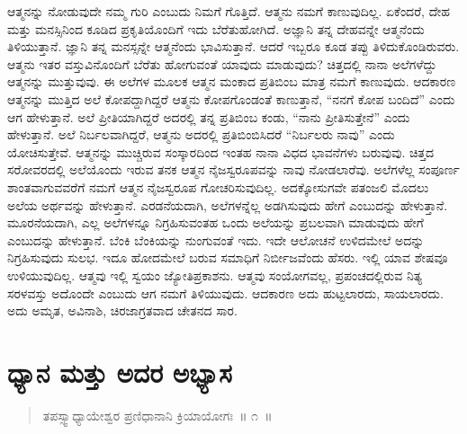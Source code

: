 ಆತ್ಮನನ್ನು ನೋಡುವುದೇ ನಮ್ಮ ಗುರಿ ಎಂಬುದು ನಿಮಗೆ ಗೊತ್ತಿದೆ. ಆತ್ಮನು ನಮಗೆ ಕಾಣುವುದಿಲ್ಲ. ಏಕೆಂದರೆ, ದೇಹ ಮತ್ತು ಮನಸ್ಸಿನಿಂದ ಕೂಡಿದ ಪ್ರಕೃತಿಯೊಂದಿಗೆ ಇದು ಬೆರೆತುಹೋಗಿದೆ. ಅಜ್ಞಾನಿ ತನ್ನ ದೇಹವನ್ನೇ ಆತ್ಮನೆಂದು ತಿಳಿಯುತ್ತಾನೆ. ಜ್ಞಾನಿ ತನ್ನ ಮನಸ್ಸನ್ನೇ ಆತ್ಮನೆಂದು ಭಾವಿಸುತ್ತಾನೆ. ಆದರೆ ಇಬ್ಬರೂ ಕೂಡ ತಪ್ಪು ತಿಳಿದುಕೊಂಡಿರುವರು. ಆತ್ಮನು ಇತರ ವಸ್ತುವಿನೊಂದಿಗೆ ಬೆರೆತು ಹೋಗುವಂತೆ ಯಾವುದು ಮಾಡುವುದು? ಚಿತ್ತದಲ್ಲಿ ನಾನಾ ಅಲೆಗಳೆದ್ದು ಆತ್ಮನನ್ನು ಮುತ್ತುವುವು. ಈ ಅಲೆಗಳ ಮೂಲಕ ಆತ್ಮನ ಮಂಕಾದ ಪ್ರತಿಬಿಂಬ ಮಾತ್ರ ನಮಗೆ ಕಾಣುವುದು. ಆದಕಾರಣ ಆತ್ಮನನ್ನು ಮುತ್ತಿದ ಅಲೆ ಕೋಪದ್ದಾಗಿದ್ದರೆ ಆತ್ಮನು ಕೋಪಗೊಂಡಂತೆ ಕಾಣುತ್ತಾನೆ, “ನನಗೆ ಕೋಪ ಬಂದಿದೆ” ಎಂದು ಆಗ ಹೇಳುತ್ತಾನೆ. ಅಲೆ ಪ್ರೀತಿಯಾಗಿದ್ದರೆ ಅದರಲ್ಲಿ ತನ್ನ ಪ್ರತಿಬಿಂಬ ಕಂಡು, “ನಾನು ಪ್ರೀತಿಸುತ್ತೇನೆ” ಎಂದು ಹೇಳುತ್ತಾನೆ. ಅಲೆ ನಿರ್ಬಲವಾಗಿದ್ದರೆ, ಆತ್ಮನು ಅದರಲ್ಲಿ ಪ್ರತಿಬಿಂಬಿಸಿದರೆ “ನಿರ್ಬಲರು ನಾವು” ಎಂದು ಯೋಚಿಸುತ್ತೇವೆ. ಆತ್ಮನನ್ನು ಮುಚ್ಚಿರುವ ಸಂಸ್ಕಾರದಿಂದ ಇಂತಹ ನಾನಾ ವಿಧದ ಭಾವನೆಗಳು ಬರುವುವು. ಚಿತ್ತದ ಸರೋವರದಲ್ಲಿ ಅಲೆಯೊಂದು ಇರುವ ತನಕ ಆತ್ಮನ ನೈಜಸ್ವರೂಪವನ್ನು ನಾವು ನೋಡಲಾರೆವು. ಅಲೆಗಳೆಲ್ಲ ಸಂಪೂರ್ಣ ಶಾಂತವಾಗುವವರೆಗೆ ನಮಗೆ ಆತ್ಮನ ನೈಜಸ್ವರೂಪ ಗೋಚರಿಸುವುದಿಲ್ಲ. ಅದಕ್ಕೋಸುಗವೇ ಪತಂಜಲಿ ಮೊದಲು ಅಲೆಯ ಅರ್ಥವನ್ನು ಹೇಳುತ್ತಾನೆ. ಎರಡನೆಯದಾಗಿ, ಅಲೆಗಳನ್ನೆಲ್ಲ ಅಡಗಿಸುವುದು ಹೇಗೆ ಎಂಬುದನ್ನು ಹೇಳುತ್ತಾನೆ. ಮೂರನೆಯದಾಗಿ, ಎಲ್ಲ ಅಲೆಗಳನ್ನೂ ನಿಗ್ರಹಿಸುವಂತಹ ಒಂದು ಅಲೆಯನ್ನು ಪ್ರಬಲವಾಗಿ ಮಾಡುವುದು ಹೇಗೆ ಎಂಬುದನ್ನು ಹೇಳುತ್ತಾನೆ. ಬೆಂಕಿ ಬೆಂಕಿಯನ್ನು ನುಂಗುವಂತೆ ಇದು. ಇದೇ ಆಲೋಚನೆ ಉಳಿದಮೇಲೆ ಅದನ್ನು ನಿಗ್ರಹಿಸುವುದು ಸುಲಭ. ಇದೂ ಹೋದಮೇಲೆ ಬರುವ ಸಮಾಧಿಗೆ ನಿರ್ಬೀಜವೆಂದು ಹೆಸರು. ಇಲ್ಲಿ ಯಾವ ಶೇಷವೂ ಉಳಿಯುವುದಿಲ್ಲ. ಆತ್ಮವು ಇಲ್ಲಿ ಸ್ವಯಂ ಜ್ಯೋತಿಪ್ರಕಾಶನು. ಆತ್ಮವು ಸಂಯೋಗವಲ್ಲ, ಪ್ರಪಂಚದಲ್ಲಿರುವ ನಿತ್ಯ ಸರಳವಸ್ತು ಅದೊಂದೇ ಎಂಬುದು ಆಗ ನಮಗೆ ತಿಳಿಯುವುದು. ಆದಕಾರಣ ಅದು ಹುಟ್ಟಲಾರದು, ಸಾಯಲಾರದು. ಅದು ಅಮೃತ, ಅವಿನಾಶಿ, ಚಿರಜಾಗ್ರತವಾದ ಚೇತನದ ಸಾರ.

\chapter{ಧ್ಯಾನ ಮತ್ತು ಅದರ ಅಭ್ಯಾಸ}%

\begin{verse}
ತಪಸ್ಸ್ವಾಧ್ಯಾಯೇಶ್ವರ ಪ್ರಣಿಧಾನಾನಿ ಕ್ರಿಯಾಯೋಗಃ~॥ ೧~॥
\end{verse}

\vspace{-0.3cm}


\vspace{0.2cm}


